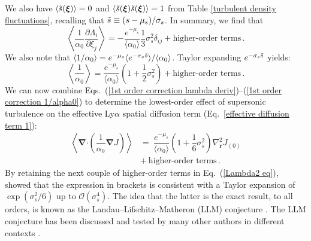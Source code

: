 \documentclass[fleqn,usenatbib]{mnras}
\begin{document}
We also have $\langle \Tilde{s}(\boldsymbol{\xi}) \rangle = 0$ and $\langle \Tilde{s}(\boldsymbol{\xi})\Tilde{s}(\boldsymbol{\xi}) \rangle = 1$ from Table \ref{turbulent density fluctuations}, recalling that $\Tilde{s} \equiv (s-\mu_s)/\sigma_s$. In summary, we find that
\begin{equation}
    \left\langle \dfrac{1}{\alpha_0}  \dfrac{\partial \Lambda_i}{\partial \xi_j}   \right\rangle =  -\dfrac{e^{-\mu_s}}{\langle \alpha_0 \rangle} \dfrac{1}{3} \sigma_s^2 \delta_{ij} + \textrm{higher-order terms} \, \label{1st order correction lambda deriv}.
\end{equation}
We also note that $\langle 1/\alpha_0 \rangle = e^{-\mu_s} \langle e^{-\sigma_s \Tilde{s}} \rangle/\langle \alpha_0 \rangle$. Taylor expanding $e^{-\sigma_s \Tilde{s}}$ yields:
\begin{equation}
    \left\langle \dfrac{1}{\alpha_0} \right\rangle = \dfrac{e^{-\mu_s}}{\langle \alpha_0 \rangle} \left(1 + \dfrac{1}{2} \sigma_s^2 \right) + \textrm{higher-order terms} \, \label{1st order correction 1/alpha0}.
\end{equation}
We can now combine Eqs.~(\ref{1st order correction lambda deriv})--(\ref{1st order correction 1/alpha0}) to determine the lowest-order effect of supersonic turbulence on the effective Ly$\alpha$ spatial diffusion term (Eq.~\ref{effective diffusion term 1}):
\begin{align}
    \left\langle \boldsymbol{\nabla} \boldsymbol{\cdot} \left( \dfrac{1}{\alpha_0}  \boldsymbol{\nabla} J  \right) \right\rangle &=~  \dfrac{e^{-\mu_s}}{\langle \alpha_0 \rangle}\left( 1 + \dfrac{1}{6} \sigma_s^2 \right) \nabla_{\boldsymbol{r}}^2 J_{(0)} \label{effective diffusion term 1st order} \\ &+~ \textrm{higher-order terms} \nonumber \, .
\end{align}
By retaining the next couple of higher-order terms in Eq.~(\ref{Lambda2 eq}), \cite{Dagan1993} showed that the expression in brackets is consistent with a Taylor expansion of $\exp( \sigma_s^2 /6)$ up to $\mathcal{O}(\sigma_s^4)$. The idea that the latter is the exact result, to all orders, is known as the Landau–Lifschitz–Matheron (LLM) conjecture \citep[after][]{Landau1960, Matheron1967}. The LLM conjecture has been discussed and tested by many other authors in different contexts \citep[e.g.][]{Dykaar1992, Neuman1993, Noetinger1994, Abramovich1995, DeWit1995, Renard1997, Sanchez2006, Jankovic2017}. 
\end{document}
